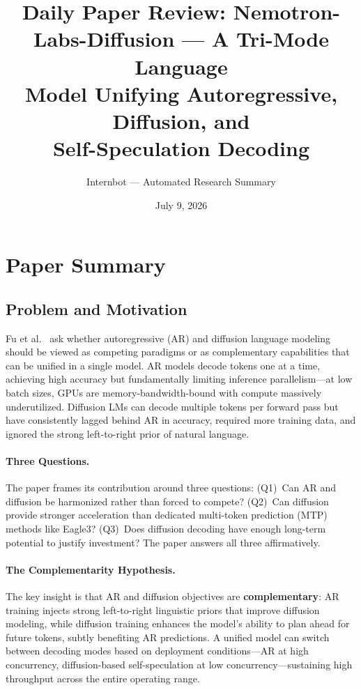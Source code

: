 \documentclass[11pt,a4paper]{article}
\title{Daily Paper Review: Nemotron-Labs-Diffusion --- A Tri-Mode Language\\Model Unifying Autoregressive, Diffusion, and\\Self-Speculation Decoding}
\author{Internbot --- Automated Research Summary}
\date{July 9, 2026}
\begin{document}
\maketitle

\section{Paper Summary}

\subsection{Problem and Motivation}

Fu et al.~\cite{fu2026nemotron} ask whether autoregressive (AR) and diffusion language modeling should be viewed as competing paradigms or as complementary capabilities that can be unified in a single model. AR models decode tokens one at a time, achieving high accuracy but fundamentally limiting inference parallelism---at low batch sizes, GPUs are memory-bandwidth-bound with compute massively underutilized. Diffusion LMs can decode multiple tokens per forward pass but have consistently lagged behind AR in accuracy, required more training data, and ignored the strong left-to-right prior of natural language.

\paragraph{Three Questions.} The paper frames its contribution around three questions: (Q1)~Can AR and diffusion be harmonized rather than forced to compete? (Q2)~Can diffusion provide stronger acceleration than dedicated multi-token prediction (MTP) methods like Eagle3? (Q3)~Does diffusion decoding have enough long-term potential to justify investment? The paper answers all three affirmatively.

\paragraph{The Complementarity Hypothesis.} The key insight is that AR and diffusion objectives are \textbf{complementary}: AR training injects strong left-to-right linguistic priors that improve diffusion modeling, while diffusion training enhances the model's ability to plan ahead for future tokens, subtly benefiting AR predictions. A unified model can switch between decoding modes based on deployment conditions---AR at high concurrency, diffusion-based self-speculation at low concurrency---sustaining high throughput across the entire operating range.
\end{document}

